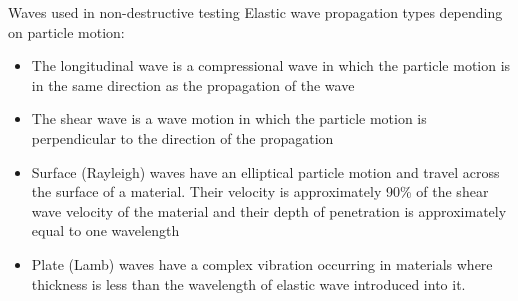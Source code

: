 \documentclass[10pt,aspectratio=169,dvipsnames]{beamer} %
\begin{document}
	\begin{frame}{Waves used in non-destructive testing}
		Elastic wave propagation types depending on particle motion:
		\begin{itemize}
			\item  \alert{The longitudinal wave} is a compressional wave in which the particle motion is in the same direction as the propagation of the wave
			\item \alert{The shear wave} is a wave motion in which the particle motion is perpendicular to the direction of the propagation
			\item \alert{Surface (Rayleigh) waves} have an elliptical particle motion and travel across the surface of a material. Their velocity is approximately 90\% of the shear wave velocity of the material and their depth of penetration is approximately equal to one
			wavelength
			\item \alert{Plate (Lamb) waves} have a complex vibration occurring in materials where thickness is less than the wavelength of elastic wave introduced into it.
		\end{itemize}
	\end{frame}
\end{document}
